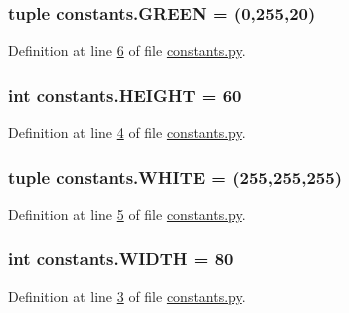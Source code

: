 \hypertarget{namespaceconstants_a71ba084102da630a352232ea121e0e95}{
\subsubsection[{G\+R\+E\+E\+N}]{\setlength{\rightskip}{0pt plus 5cm}tuple constants.\+G\+R\+E\+E\+N = (0,255,20)}}\label{namespaceconstants_a71ba084102da630a352232ea121e0e95}


Definition at line \hyperlink{constants_8py_source_l00006}{6} of file \hyperlink{constants_8py_source}{constants.\+py}.

\hypertarget{namespaceconstants_a581305cb095bf2d8826a12abef66a15e}{
\subsubsection[{H\+E\+I\+G\+H\+T}]{\setlength{\rightskip}{0pt plus 5cm}int constants.\+H\+E\+I\+G\+H\+T = 60}}\label{namespaceconstants_a581305cb095bf2d8826a12abef66a15e}


Definition at line \hyperlink{constants_8py_source_l00004}{4} of file \hyperlink{constants_8py_source}{constants.\+py}.

\hypertarget{namespaceconstants_ab7ba6a498f408091781f6f90a0446bcc}{
\subsubsection[{W\+H\+I\+T\+E}]{\setlength{\rightskip}{0pt plus 5cm}tuple constants.\+W\+H\+I\+T\+E = (255,255,255)}}\label{namespaceconstants_ab7ba6a498f408091781f6f90a0446bcc}


Definition at line \hyperlink{constants_8py_source_l00005}{5} of file \hyperlink{constants_8py_source}{constants.\+py}.

\hypertarget{namespaceconstants_aa1f49ae50d4547cd3b9f4801d04f5830}{
\subsubsection[{W\+I\+D\+T\+H}]{\setlength{\rightskip}{0pt plus 5cm}int constants.\+W\+I\+D\+T\+H = 80}}\label{namespaceconstants_aa1f49ae50d4547cd3b9f4801d04f5830}


Definition at line \hyperlink{constants_8py_source_l00003}{3} of file \hyperlink{constants_8py_source}{constants.\+py}.

